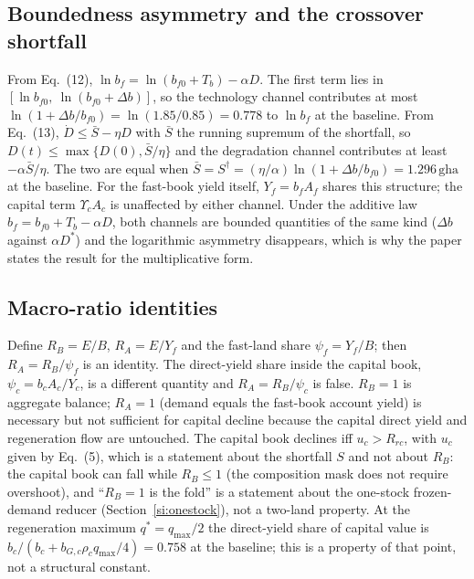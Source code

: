 \documentclass[11pt,a4paper]{article}
\newcommand{\Ups}{\Upsilon_c}
\begin{document}
\subsection{Boundedness asymmetry and the crossover shortfall}\label{si:bounded}

From Eq.~(12), $\ln b_f=\ln(b_{f0}+T_b)-\alpha D$. The first term lies in $[\ln b_{f0},\ \ln(b_{f0}+\Delta b)]$, so the technology channel contributes at most $\ln(1+\Delta b/b_{f0})=\ln(1.85/0.85)=0.778$ to $\ln b_f$ at the baseline. From Eq.~(13), $\dot D\le\bar S-\eta D$ with $\bar S$ the running supremum of the shortfall, so $D(t)\le\max\{D(0),\bar S/\eta\}$ and the degradation channel contributes at least $-\alpha\bar S/\eta$. The two are equal when $\bar S=S^\dagger=(\eta/\alpha)\ln(1+\Delta b/b_{f0})=1.296\,\mathrm{gha}$ at the baseline. For the fast-book yield itself, $Y_f=b_fA_f$ shares this structure; the capital term $\Ups A_c$ is unaffected by either channel. Under the additive law $b_f=b_{f0}+T_b-\alpha D$, both channels are bounded quantities of the same kind ($\Delta b$ against $\alpha D^*$) and the logarithmic asymmetry disappears, which is why the paper states the result for the multiplicative form.

\subsection{Macro-ratio identities}\label{si:ratios}

Define $R_B=E/B$, $R_A=E/Y_f$ and the fast-land share $\psi_f=Y_f/B$; then $R_A=R_B/\psi_f$ is an identity. The direct-yield share inside the capital book, $\psi_c=b_cA_c/Y_c$, is a different quantity and $R_A=R_B/\psi_c$ is false. $R_B=1$ is aggregate balance; $R_A=1$ (demand equals the fast-book account yield) is necessary but not sufficient for capital decline because the capital direct yield and regeneration flow are untouched. The capital book declines iff $u_c>R_{rc}$, with $u_c$ given by Eq.~(5), which is a statement about the shortfall $S$ and not about $R_B$: the capital book can fall while $R_B\le1$ (the composition mask does not require overshoot), and ``$R_B=1$ is the fold'' is a statement about the one-stock frozen-demand reducer (Section~\ref{si:onestock}), not a two-land property. At the regeneration maximum $q^*=q_{\max}/2$ the direct-yield share of capital value is $b_c/(b_c+b_{G,c}\rho_cq_{\max}/4)=0.758$ at the baseline; this is a property of that point, not a structural constant.
\end{document}
